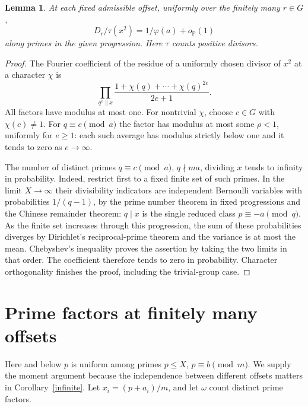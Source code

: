 \documentclass[11pt]{article}
\newtheorem{lemma}[theorem]{Lemma}
\newcommand{\op}{o_{\mathbb P}}
\begin{document}
\begin{lemma}\label{mix}
At each fixed admissible offset, uniformly over the finitely many $r\in G$,
\[
 D_r/\tau(x^2)=1/\varphi(a)+\op(1)
\]
along primes in the given progression. Here $\tau$ counts positive divisors.
\end{lemma}
\begin{proof}
The Fourier coefficient of the residue of a uniformly chosen divisor of $x^2$ at a character $\chi$ is
\[
 \prod_{q^e\parallel x}\frac{1+\chi(q)+\cdots+\chi(q)^{2e}}{2e+1}.
\]
All factors have modulus at most one. For nontrivial $\chi$, choose $c\in G$ with $\chi(c)\ne1$. For $q\equiv c\pmod a$ the factor has modulus at most some $\rho<1$, uniformly for $e\ge1$: each such average has modulus strictly below one and it tends to zero as $e\to\infty$.

The number of distinct primes $q\equiv c\pmod a$, $q\nmid ma$, dividing $x$ tends to infinity in probability. Indeed, restrict first to a fixed finite set of such primes. In the limit $X\to\infty$ their divisibility indicators are independent Bernoulli variables with probabilities $1/(q-1)$, by the prime number theorem in fixed progressions and the Chinese remainder theorem: $q\mid x$ is the single reduced class $p\equiv-a\pmod q$. As the finite set increases through this progression, the sum of these probabilities diverges by Dirichlet's reciprocal-prime theorem and the variance is at most the mean. Chebyshev's inequality proves the assertion by taking the two limits in that order. The coefficient therefore tends to zero in probability. Character orthogonality finishes the proof, including the trivial-group case.
\end{proof}

\section{Prime factors at finitely many offsets}
Here and below $p$ is uniform among primes $p\le X$, $p\equiv b\pmod m$. We supply the moment argument because the independence between different offsets matters in Corollary~\ref{infinite}. Let $x_i=(p+a_i)/m$, and let $\omega$ count distinct prime factors.
\end{document}
